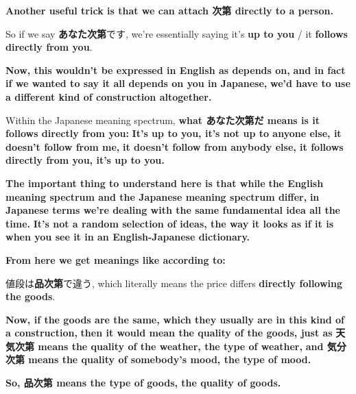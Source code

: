 \stopsectionlevel

\startsectionlevel[title={Attaching 次第 to a person},reference={attaching-次第-to-a-person}]

{\bf Another useful trick is that we can attach 次第 directly to a person.}

{}

So if we say {\bf あなた次第}です, we're essentially saying it's {\bf up to you} / it {\bf follows directly from you}.

{\bf Now, this wouldn't be expressed in English as depends on,} {\bf and in fact if we wanted to say it all depends on you in Japanese,} {\bf we'd have to use a different kind of construction altogether.}

\thinrule

Within the Japanese meaning spectrum, {\bf what あなた次第だ means is it follows directly from you:} {\bf It's up to you, it's not up to anyone else, it doesn't follow from me,} {\bf it doesn't follow from anybody else, it follows directly from you, it's up to you.}

\thinrule

{\bf The important thing to understand here is that while} {\bf the English meaning spectrum and the Japanese meaning spectrum differ,} {\bf in Japanese terms we're dealing with the same fundamental idea all the time.} {\bf It's not a random selection of ideas, the way it looks as if it is} {\bf when you see it in an English-Japanese dictionary.}

\stopsectionlevel

\stopsectionlevel

\startsectionlevel[title={次第 as according to},reference={次第-as-according-to}]

{\bf From here we get meanings like according to:}

値段は{\bf 品次第}で違う, which literally means the price differs {\bf directly following the goods}.

{}

{\bf Now, if the goods are the same, which they usually are in this kind of a construction,} {\bf then it would mean the quality of the goods, just as} {\bf 天気次第 means the quality of the weather, the type of weather,} {\bf and 気分次第 means the quality of somebody's mood, the type of mood.}

{\bf So, 品次第 means the type of goods, the quality of goods.}


